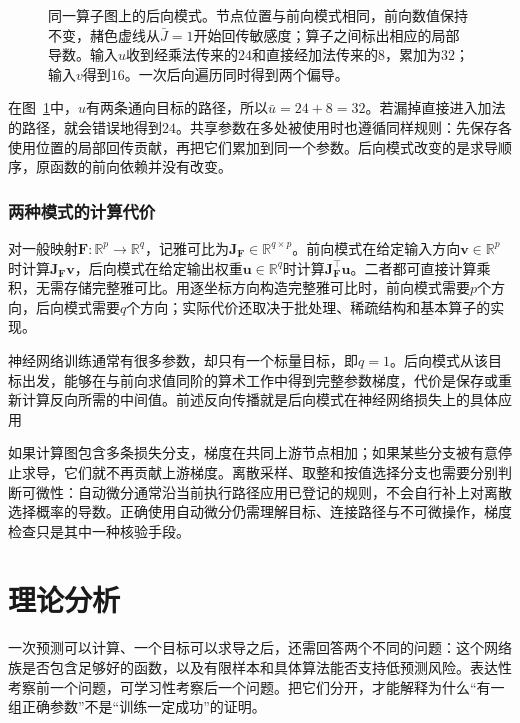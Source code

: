 \begin{figure}[htb]
  \centering
  
  \caption{同一算子图上的后向模式。节点位置与前向模式相同，前向数值保持不变，赭色虚线从$\bar J=1$开始回传敏感度；算子之间标出相应的局部导数。输入$u$收到经乘法传来的$24$和直接经加法传来的$8$，累加为$32$；输入$v$得到$16$。一次后向遍历同时得到两个偏导。}
  \label{fig:ffn-autodiff-reverse}
\end{figure}

在图~\ref{fig:ffn-autodiff-reverse}中，$u$有两条通向目标的路径，所以$\bar u=24+8=32$。若漏掉直接进入加法的路径，就会错误地得到$24$。共享参数在多处被使用时也遵循同样规则：先保存各使用位置的局部回传贡献，再把它们累加到同一个参数。后向模式改变的是求导顺序，原函数的前向依赖并没有改变。

\FloatBarrier
\subsubsection{两种模式的计算代价}
\label{sec:ffn-autodiff-cost}

对一般映射$\bm{F}:\mathbb{R}^{p}\to\mathbb{R}^{q}$，记雅可比为$\bm{J}_{\bm{F}}\in\mathbb{R}^{q\times p}$。前向模式在给定输入方向$\bm{v}\in\mathbb{R}^{p}$时计算$\bm{J}_{\bm{F}}\bm{v}$，后向模式在给定输出权重$\bm{u}\in\mathbb{R}^{q}$时计算$\bm{J}_{\bm{F}}^{\top}\bm{u}$。二者都可直接计算乘积，无需存储完整雅可比。用逐坐标方向构造完整雅可比时，前向模式需要$p$个方向，后向模式需要$q$个方向；实际代价还取决于批处理、稀疏结构和基本算子的实现。

神经网络训练通常有很多参数，却只有一个标量目标，即$q=1$。后向模式从该目标出发，能够在与前向求值同阶的算术工作中得到完整参数梯度，代价是保存或重新计算反向所需的中间值。前述反向传播就是后向模式在神经网络损失上的具体应用

如果计算图包含多条损失分支，梯度在共同上游节点相加；如果某些分支被有意停止求导，它们就不再贡献上游梯度。离散采样、取整和按值选择分支也需要分别判断可微性：自动微分通常沿当前执行路径应用已登记的规则，不会自行补上对离散选择概率的导数。正确使用自动微分仍需理解目标、连接路径与不可微操作，梯度检查只是其中一种核验手段。

\section{理论分析}
\label{sec:ffn-theory}

一次预测可以计算、一个目标可以求导之后，还需回答两个不同的问题：这个网络族是否包含足够好的函数，以及有限样本和具体算法能否支持低预测风险。表达性考察前一个问题，可学习性考察后一个问题。把它们分开，才能解释为什么“有一组正确参数”不是“训练一定成功”的证明。


